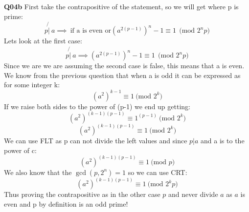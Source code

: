 \documentclass[11pt]{article}
\begin{document}
\textbf{Q04b} First take the contrapositive of the statement, so we will get where p is prime:
\[ p \not{|} \ a \implies \ \text{if a is even or} (a^{2(p-1)})^n-1 \equiv 1 \ \ \text{(mod $2^np$)} \]
Lets look at the first case:
\[ p \not{|} \ a \implies (a^{2(p-1)})^n-1 \equiv 1 \ \ \text{(mod $2^np$)} \]
Since we are we are assuming the second case is false, this means that a is even. We know from the previous question that when a is odd it can be expressed as for some integer k:
\[ (a^2)^{k-1} \equiv 1 \ \text{(mod $2^k$)} \]
If we raise both sides to the power of (p-1) we end up getting:
\[ (a^2)^{(k-1)(p-1)} \equiv 1^(p-1) \ \text{(mod $2^k$)} \]
\[ (a^2)^{(k-1)(p-1)} \equiv 1 \ \text{(mod $2^k$)} \]
We can use FLT as p can not divide the left values and since $p|a$ and a is to the power of c:
\[ (a^2)^{(k-1)(p-1)} \equiv 1 \ \text{(mod $p$)} \]
We also know that the $\gcd(p, 2^n) = 1$ so we can use CRT:
\[ (a^2)^{(k-1)(p-1)} \equiv 1 \ \text{(mod $2^kp$)} \]
Thus proving the contrapositive as in the other case $p$ and never divide $a$ as $a$ is even and p by definition is an odd prime!
\end{document}
